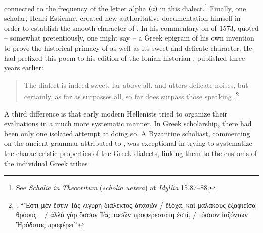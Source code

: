 connected to the frequency of the letter alpha ⟨α⟩ in this dialect.\footnote{See \textit{Scholia in Theocritum} (\textit{scholia uetera}) at \textit{Idyllia} 15.87–88.} Finally, one scholar, Henri Estienne, created new authoritative documentation himself in order to establish the smooth character of . In his commentary on  of 1573, \citet[ii\textsc{\textsuperscript{r}}]{Estienne1573} quoted – somewhat pretentiously, one might say – a Greek epigram of his own invention to prove the historical primacy of  as well as its sweet and delicate character. He had prefixed this poem to his edition of the Ionian historian , published three years earlier:

\begin{quote}\raggedright
The  dialect is indeed sweet, far above all,\linebreak
and utters delicate noises, but certainly,\linebreak
as far as  surpasses all, so far\linebreak
does  surpass those speaking .\footnote{\citet[8]{Estienne1570}: “Ἔστι μὲν ἔστιν Ἰὰς λιγυρὴ διάλεκτος ἁπασῶν / ἔξοχα, καὶ μαλακοὺς ἐξαφιεῖσα θρόους· / ἀλλὰ γὰρ ὅσσον Ἰὰς πασῶν προφερεστάτη ἐστί, / τόσσον ἰαζόντων Ἡρόδοτος προφέρει”.}
\end{quote}

A third difference is that early modern Hellenists tried to organize their evaluations in a much more systematic manner. In Greek scholarship, there had been only one isolated attempt at doing so. A Byzantine scholiast, commenting on the ancient grammar attributed to , was exceptional in trying to systematize the characteristic properties of the Greek dialects, linking them to the customs of the individual Greek tribes:

